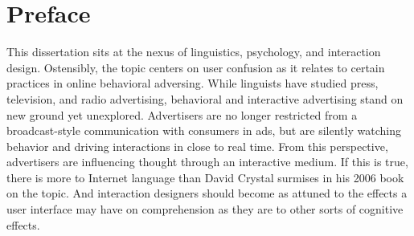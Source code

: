 

\begingroup

\let\clearpage\relax
\let\cleardoublepage\relax
\let\cleardoublepage\relax

\chapter*{Preface} 

This dissertation sits at the nexus of linguistics, psychology, and interaction design. Ostensibly, the topic centers on user confusion as it relates to certain practices in online behavioral adversing. While linguists have studied press, television, and radio advertising, behavioral and interactive advertising stand on new ground yet unexplored. Advertisers are no longer restricted from a broadcast-style communication with consumers in ads, but are silently watching behavior and driving interactions in close to real time. From this perspective, advertisers are influencing thought through an interactive medium. If this is true, there is more to Internet language than David Crystal surmises in his 2006 book on the topic. And interaction designers should become as attuned to the effects a user interface may have on comprehension as they are to other sorts of cognitive effects.


\bigskip
\endgroup


